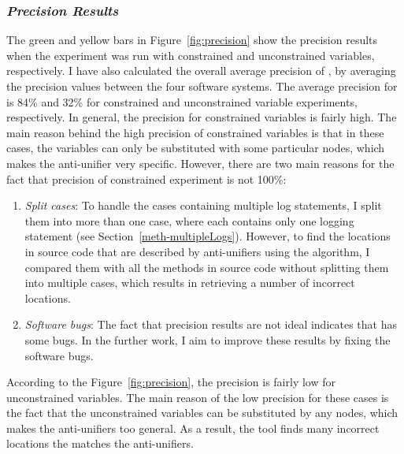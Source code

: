 \subsubsection{\emph{Precision Results}}  \label{precision-results}
The green and yellow bars in Figure~\ref{fig:precision} show the precision results when the experiment was run with constrained and unconstrained variables, respectively. I have also calculated the overall average precision of , by averaging the precision values between the four software systems. The average precision for  is 84\% and 32\% for constrained and unconstrained variable experiments, respectively. In general, the precision for constrained variables is fairly high. The main reason behind the high precision of constrained variables is that in these cases, the variables can only be substituted with some particular nodes, which makes the anti-unifier very specific. However, there are two main reasons for the fact that precision of constrained experiment is not 100\%:
\begin{enumerate} [leftmargin=.5in]

\item \emph{Split cases}: To handle the cases containing multiple log statements, I split them into more than one case, where each contains only one logging statement (see Section~\ref{meth-multipleLogs}). However, to find the locations in source code that are described by anti-unifiers using the  algorithm, I compared them with all the methods in source code without splitting them into multiple cases, which results in retrieving a number of incorrect locations. 

\item \emph{Software bugs}: The fact that precision results are not ideal indicates that  has some bugs. In the further work, I aim to improve these results by fixing the software bugs.
\end{enumerate}

According to the Figure~\ref{fig:precision}, the precision is fairly low for unconstrained variables. The main reason of the low precision for these cases is the fact that the unconstrained variables can be substituted by any nodes, which makes the anti-unifiers too general. As a result, the tool finds many incorrect locations the matches the anti-unifiers.






